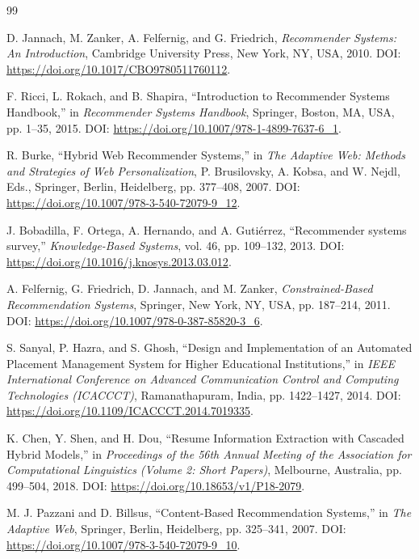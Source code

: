\renewcommand{\bibname}{References} %

\begin{thebibliography}{99} %

D. Jannach, M. Zanker, A. Felfernig, and G. Friedrich, \emph{Recommender Systems: An Introduction}, Cambridge University Press, New York, NY, USA, 2010. DOI: \url{https://doi.org/10.1017/CBO9780511760112}.

F. Ricci, L. Rokach, and B. Shapira, “Introduction to Recommender Systems Handbook,” in \emph{Recommender Systems Handbook}, Springer, Boston, MA, USA, pp. 1--35, 2015. DOI: \url{https://doi.org/10.1007/978-1-4899-7637-6_1}.

R. Burke, “Hybrid Web Recommender Systems,” in \emph{The Adaptive Web: Methods and Strategies of Web Personalization}, P. Brusilovsky, A. Kobsa, and W. Nejdl, Eds., Springer, Berlin, Heidelberg, pp. 377--408, 2007. DOI: \url{https://doi.org/10.1007/978-3-540-72079-9_12}.

J. Bobadilla, F. Ortega, A. Hernando, and A. Guti{\'e}rrez, “Recommender systems survey,” \emph{Knowledge-Based Systems}, vol. 46, pp. 109--132, 2013. DOI: \url{https://doi.org/10.1016/j.knosys.2013.03.012}.

A. Felfernig, G. Friedrich, D. Jannach, and M. Zanker, \emph{Constrained-Based Recommendation Systems}, Springer, New York, NY, USA, pp. 187--214, 2011. DOI: \url{https://doi.org/10.1007/978-0-387-85820-3_6}.

S. Sanyal, P. Hazra, and S. Ghosh, “Design and Implementation of an Automated Placement Management System for Higher Educational Institutions,” in \emph{IEEE International Conference on Advanced Communication Control and Computing Technologies (ICACCCT)}, Ramanathapuram, India, pp. 1422--1427, 2014. DOI: \url{https://doi.org/10.1109/ICACCCT.2014.7019335}.

K. Chen, Y. Shen, and H. Dou, “Resume Information Extraction with Cascaded Hybrid Models,” in \emph{Proceedings of the 56th Annual Meeting of the Association for Computational Linguistics (Volume 2: Short Papers)}, Melbourne, Australia, pp. 499--504, 2018. DOI: \url{https://doi.org/10.18653/v1/P18-2079}.

M. J. Pazzani and D. Billsus, “Content-Based Recommendation Systems,” in \emph{The Adaptive Web}, Springer, Berlin, Heidelberg, pp. 325--341, 2007. DOI: \url{https://doi.org/10.1007/978-3-540-72079-9_10}.


\end{thebibliography}
